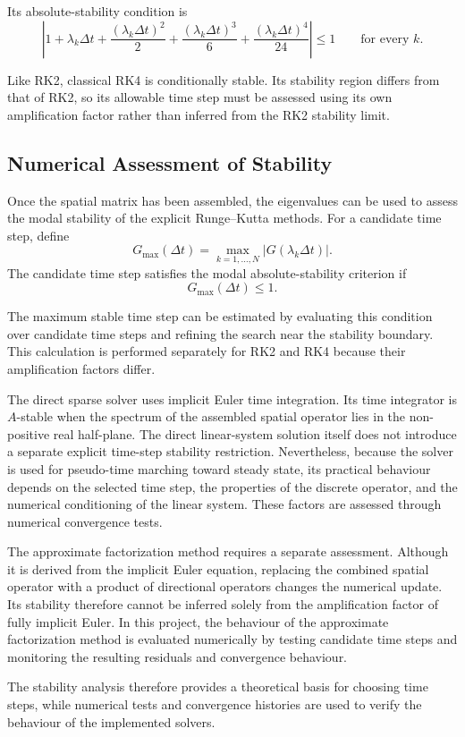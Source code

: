 Its absolute-stability condition is
\begin{equation}
\boxed{
\left|
1+\lambda_k\Delta t
+\frac{(\lambda_k\Delta t)^2}{2}
+\frac{(\lambda_k\Delta t)^3}{6}
+\frac{(\lambda_k\Delta t)^4}{24}
\right|
\leq 1
\qquad \text{for every } k.
}
\label{eq:rk4_stability}
\end{equation}

Like RK2, classical RK4 is conditionally stable. Its
stability region differs from that of RK2, so its allowable
time step must be assessed using its own amplification
factor rather than inferred from the RK2 stability limit.

\subsection{Numerical Assessment of Stability}

Once the spatial matrix has been assembled, the eigenvalues
can be used to assess the modal stability of the explicit
Runge--Kutta methods. For a candidate time step, define
\begin{equation}
G_{\max}(\Delta t)
=
\max_{k=1,\ldots,N}
\left|G(\lambda_k\Delta t)\right|.
\label{eq:maximum_amplification}
\end{equation}
The candidate time step satisfies the modal
absolute-stability criterion if
\begin{equation}
\boxed{
G_{\max}(\Delta t)\leq 1.
}
\label{eq:maximum_amplification_condition}
\end{equation}

The maximum stable time step can be estimated by evaluating
this condition over candidate time steps and refining the
search near the stability boundary. This calculation is
performed separately for RK2 and RK4 because their
amplification factors differ.

The direct sparse solver uses implicit Euler time integration.
Its time integrator is $A$-stable when the spectrum of the
assembled spatial operator lies in the non-positive real
half-plane. The direct linear-system solution itself does not
introduce a separate explicit time-step stability restriction.
Nevertheless, because the solver is used for pseudo-time
marching toward steady state, its practical behaviour depends
on the selected time step, the properties of the discrete
operator, and the numerical conditioning of the linear system.
These factors are assessed through numerical convergence tests.

The approximate factorization method requires a separate
assessment. Although it is derived from the implicit Euler
equation, replacing the combined spatial operator with a
product of directional operators changes the numerical
update. Its stability therefore cannot be inferred solely
from the amplification factor of fully implicit Euler.
In this project, the behaviour of the approximate
factorization method is evaluated numerically by testing
candidate time steps and monitoring the resulting residuals
and convergence behaviour.

The stability analysis therefore provides a
theoretical basis for choosing time steps, while numerical
tests and convergence histories are used to verify the
behaviour of the implemented solvers.